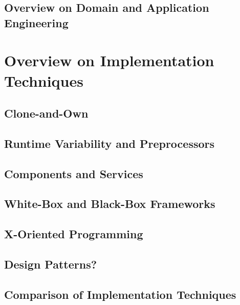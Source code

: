 \subsection{Overview on Domain and Application Engineering}

%

\lessonslearned{
	\item \ldots
}{
	\item \ldots
}{
	\ldots
}

\sectionend

\section{Overview on Implementation Techniques}

\subsection{Clone-and-Own}
\subsection{Runtime Variability and Preprocessors}
\subsection{Components and Services}
\subsection{White-Box and Black-Box Frameworks}
\subsection{X-Oriented Programming}
\subsection{Design Patterns?}
\subsection{Comparison of Implementation Techniques}

